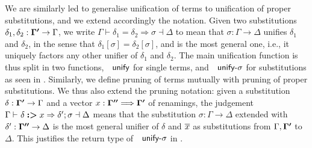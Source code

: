 We are similarly led to generalise unification of terms to unification
of proper substitutions, and we extend accordingly the notation. Given
two substitutions $\delta_{1},\delta_{2}:\boldsymbol{\Gamma'}\rightarrow\Gamma$,
we write $\Gamma\vdash\delta_{1}=\delta_{2}\Rightarrow\sigma\dashv\Delta$
to mean that $\sigma:\Gamma\rightarrow\Delta$ unifies $\delta_{1}$
and $\delta_{2}$, in the sense that $\delta_{1}[\sigma]=\delta_{2}[\sigma]$,
and is the most general one, i.e., it uniquely factors any other unifier
of $\delta_{1}$ and $\delta_{2}$. The main unification function
is thus split in two functions, $\AgdaFunction{unify}$ for single
terms, and $\AgdaFunction{unify-\ensuremath{\sigma}}$ for substitutions
as seen in . Similarly, we define pruning
of terms mutually with pruning of proper substitutions. We thus also
extend the pruning notation: given a substitution $\delta:\boldsymbol{\Gamma'}\rightarrow\Gamma$
and a vector $x:\boldsymbol{\Gamma''}\Longrightarrow\boldsymbol{\Gamma'}$
of renamings, the judgement $\Gamma\vdash_{}\delta\boldsymbol{:>}x\Rightarrow\delta';\sigma\dashv\Delta$
means that the substitution $\sigma:\Gamma\rightarrow\Delta$ extended
with $\delta':\boldsymbol{\Gamma''}\rightarrow\Delta$ is the most
general unifier of $\delta$ and $\overline{x}$ as substitutions
from $\Gamma,\boldsymbol{\Gamma'}$ to $\Delta$. This justifies
the return type of $\AgdaFunction{unify-\ensuremath{\sigma}}$ in
.
\begin{flushleft}
\par\end{flushleft}


